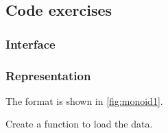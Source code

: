 \subsection{Code exercises}

\subsubsection*{Interface}



\subsubsection*{Representation}


The format is shown in \cref{fig:monoid1}.



\begin{gradedexercise}[Representation]
  Create a function to load the data.
%

\end{gradedexercise}

